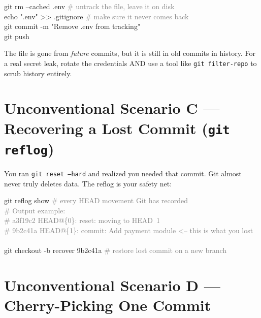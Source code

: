 \documentclass[10pt,a4paper]{article}
\newenvironment{codebox}{%
  \begin{mdframed}[backgroundcolor=codebg, linewidth=0pt,
    innerleftmargin=6pt, innerrightmargin=6pt,
    innertopmargin=4pt, innerbottommargin=4pt]%
  \small\ttfamily
}{%
  \end{mdframed}%
}
\newenvironment{notebox}{%
  \begin{mdframed}[backgroundcolor=notebg, linewidth=0.6pt,
    innerleftmargin=6pt, innerrightmargin=6pt,
    innertopmargin=3pt, innerbottommargin=3pt]%
  \small
}{%
  \end{mdframed}%
}
\newcommand{\cmd}[1]{\texttt{\small #1}}
\begin{document}
\begin{codebox}
git rm --cached .env                    \textcolor{gray}{\# untrack the file, leave it on disk}\\
echo ".env" >> .gitignore               \textcolor{gray}{\# make sure it never comes back}\\
git commit -m "Remove .env from tracking"\\
git push
\end{codebox}

\begin{notebox}
The file is gone from \emph{future} commits, but it is still in old commits in history.
For a real secret leak, rotate the credentials AND use a tool like
\texttt{git filter-repo} to scrub history entirely.
\end{notebox}

\section{Unconventional Scenario C --- Recovering a Lost Commit (\texttt{git reflog})}

You ran \cmd{git reset --hard} and realized you needed that commit.
Git almost never truly deletes data. The reflog is your safety net:

\begin{codebox}
git reflog show             \textcolor{gray}{\# every HEAD movement Git has recorded}\\
\textcolor{gray}{\# Output example:}\\
\textcolor{gray}{\# a3f19c2 HEAD@\{0\}: reset: moving to HEAD~1}\\
\textcolor{gray}{\# 9b2c41a HEAD@\{1\}: commit: Add payment module  <-- this is what you lost}\\
\\
git checkout -b recover 9b2c41a     \textcolor{gray}{\# restore lost commit on a new branch}
\end{codebox}

\section{Unconventional Scenario D --- Cherry-Picking One Commit}
\end{document}
